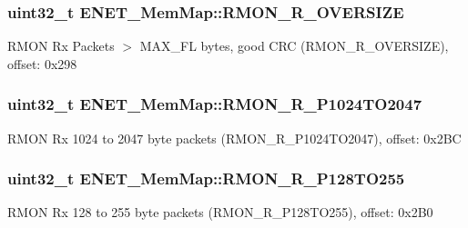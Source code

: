 \subsubsection[{R\+M\+O\+N\+\_\+\+R\+\_\+\+O\+V\+E\+R\+S\+I\+Z\+E}]{\setlength{\rightskip}{0pt plus 5cm}uint32\+\_\+t E\+N\+E\+T\+\_\+\+Mem\+Map\+::\+R\+M\+O\+N\+\_\+\+R\+\_\+\+O\+V\+E\+R\+S\+I\+Z\+E}\label{struct_e_n_e_t___mem_map_a0519d6cb1049fe7cb867b1ede8957240}
R\+M\+O\+N Rx Packets $>$ M\+A\+X\+\_\+\+F\+L bytes, good C\+R\+C (R\+M\+O\+N\+\_\+\+R\+\_\+\+O\+V\+E\+R\+S\+I\+Z\+E), offset\+: 0x298 \hypertarget{struct_e_n_e_t___mem_map_aaaa7843777b1e6655435adc36b7b8f35}{}
\subsubsection[{R\+M\+O\+N\+\_\+\+R\+\_\+\+P1024\+T\+O2047}]{\setlength{\rightskip}{0pt plus 5cm}uint32\+\_\+t E\+N\+E\+T\+\_\+\+Mem\+Map\+::\+R\+M\+O\+N\+\_\+\+R\+\_\+\+P1024\+T\+O2047}\label{struct_e_n_e_t___mem_map_aaaa7843777b1e6655435adc36b7b8f35}
R\+M\+O\+N Rx 1024 to 2047 byte packets (R\+M\+O\+N\+\_\+\+R\+\_\+\+P1024\+T\+O2047), offset\+: 0x2\+B\+C \hypertarget{struct_e_n_e_t___mem_map_aedabd39592fecde58ed77f69468a34a0}{}
\subsubsection[{R\+M\+O\+N\+\_\+\+R\+\_\+\+P128\+T\+O255}]{\setlength{\rightskip}{0pt plus 5cm}uint32\+\_\+t E\+N\+E\+T\+\_\+\+Mem\+Map\+::\+R\+M\+O\+N\+\_\+\+R\+\_\+\+P128\+T\+O255}\label{struct_e_n_e_t___mem_map_aedabd39592fecde58ed77f69468a34a0}
R\+M\+O\+N Rx 128 to 255 byte packets (R\+M\+O\+N\+\_\+\+R\+\_\+\+P128\+T\+O255), offset\+: 0x2\+B0 \hypertarget{struct_e_n_e_t___mem_map_a2f120e220238a9e7ffea616be9277d07}{}

